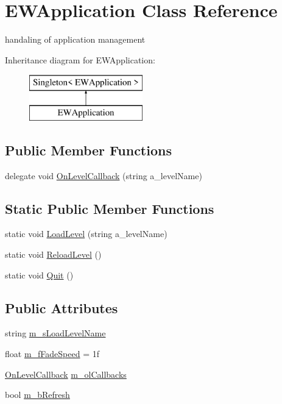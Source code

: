 \hypertarget{class_e_w_application}{}\section{E\+W\+Application Class Reference}
\label{class_e_w_application}


handaling of application management  


Inheritance diagram for E\+W\+Application\+:\begin{figure}[H]
\begin{center}
\leavevmode
\includegraphics[height=2.000000cm]{class_e_w_application}
\end{center}
\end{figure}
\subsection*{Public Member Functions}
\begin{DoxyCompactItemize}
\item 
delegate void \mbox{\hyperlink{class_e_w_application_a8d1ecb5cea1da7551cad3891088b67b4}{On\+Level\+Callback}} (string a\+\_\+level\+Name)
\end{DoxyCompactItemize}
\subsection*{Static Public Member Functions}
\begin{DoxyCompactItemize}
\item 
static void \mbox{\hyperlink{class_e_w_application_ae8a4acbd295411a6089820b7173a9e17}{Load\+Level}} (string a\+\_\+level\+Name)
\item 
static void \mbox{\hyperlink{class_e_w_application_a88c9fd7e1cb550fee5e2cc048ed08f77}{Reload\+Level}} ()
\item 
static void \mbox{\hyperlink{class_e_w_application_ae161cefbe0c88b3c72b3acb3ef5686c7}{Quit}} ()
\end{DoxyCompactItemize}
\subsection*{Public Attributes}
\begin{DoxyCompactItemize}
\item 
string \mbox{\hyperlink{class_e_w_application_a4a612f1850b3cf352582485b48f61def}{m\+\_\+s\+Load\+Level\+Name}}
\item 
float \mbox{\hyperlink{class_e_w_application_ac613173e21f3f946c7231f25ed9c2bda}{m\+\_\+f\+Fade\+Speed}} = 1f
\item 
\mbox{\hyperlink{class_e_w_application_a8d1ecb5cea1da7551cad3891088b67b4}{On\+Level\+Callback}} \mbox{\hyperlink{class_e_w_application_ab8e11eacf23e57a5d8540d0aa112eeaf}{m\+\_\+ol\+Callbacks}}
\item 
bool \mbox{\hyperlink{class_e_w_application_a172703f8962f0aee398c21d98b037e59}{m\+\_\+b\+Refresh}}
\end{DoxyCompactItemize}
